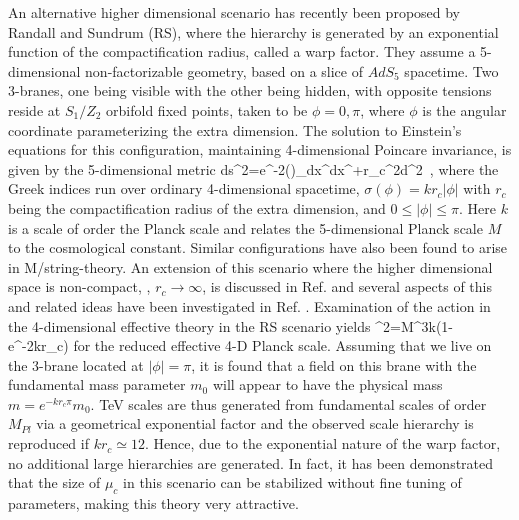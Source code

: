 An alternative higher dimensional scenario has recently been proposed by
Randall and Sundrum\cite{rs1} (RS), where the hierarchy is generated by an
exponential function of the compactification radius, called a warp factor.
They assume a 5-dimensional non-factorizable geometry, based on a slice
of $AdS_5$ spacetime.  Two 3-branes, one being visible with the other being
hidden, with opposite tensions reside at
$S_1/Z_2$ orbifold fixed points, taken to be $\phi=0,\pi$, where $\phi$ is
the angular coordinate parameterizing the extra dimension.  The 
solution to Einstein's equations for this configuration, maintaining
4-dimensional Poincare invariance, is given by the 5-dimensional metric
\be
ds^2=e^{-2\sigma(\phi)}\eta_{\mu\nu}dx^\mu dx^\nu+r_c^2d\phi^2 \,,
\label{5metric}
\ee
where the Greek indices run over ordinary 4-dimensional spacetime, 
$\sigma(\phi)=kr_c|\phi|$ with $r_c$ being the compactification radius of the
extra dimension, and $0\leq |\phi|\leq\pi$.  Here $k$ is a scale of
order the Planck scale and relates the 5-dimensional Planck scale $M$ to the 
cosmological constant.  Similar configurations have also been found to arise in 
M/string-theory\cite{strings}.  An extension of this scenario where the
higher dimensional space is non-compact, \ie, $r_c\to \infty$, is discussed
in Ref. \cite{rs2} and several aspects of this and related ideas have been
investigated in Ref. \cite{morestuff}.  Examination of the action in the 
4-dimensional effective theory in the RS scenario yields\cite{rs1}
\be
\mpl^2={M^3\over k}(1-e^{-2kr_c\pi}) 
\label{mpl}
\ee
for the reduced effective 4-D Planck scale.  
Assuming that we live on the 3-brane located at $|\phi|=\pi$, it is found
that a field on this brane with the fundamental mass
parameter $m_0$ will appear to have the physical mass $m=e^{-kr_c\pi}m_0$.
TeV scales are thus generated from fundamental scales of order $M_{Pl}$
via a geometrical exponential factor and the observed scale hierarchy is
reproduced if $kr_c\simeq 12$.  Hence, due to the exponential nature of the
warp factor, no additional large hierarchies are generated.  In fact, it has 
been demonstrated\cite{gw2} that the 
size of $\mu_c$ in this scenario can be stabilized without fine tuning of 
parameters, making this theory very attractive.

